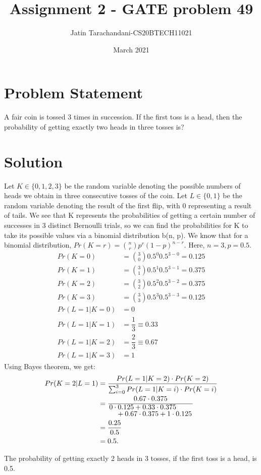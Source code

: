 \documentclass[twocolumn]{article}
\title{Assignment 2 - GATE problem 49}
\author{Jatin Tarachandani-CS20BTECH11021}
\date{March 2021}
\begin{document}
\maketitle
\section{Problem Statement}
A fair coin is tossed 3 times in succession. If the first toss is a head, then the probability of getting exactly two heads in three tosses is?
\section{Solution}
Let $K \in \{0, 1, 2, 3\}$ be the random variable denoting the possible numbers of heads we obtain in three consecutive tosses of the coin. Let $L \in \{0, 1\}$ be the random variable denoting the result of the first flip, with 0 representing a result of tails.
We see that K represents the probabilities of getting a certain number of successes in 3 distinct Bernoulli trials, so we can find the probabilities for K to take its possible values via a binomial distribution b(n, p).
We know that for a binomial distribution, $Pr(K=r)=\binom{n}{r}p^r (1-p)^{n-r}$. Here, $n=3, p=0.5$.
\begin{align}
    Pr(K=0)&=\binom{3}{0}0.5^0 0.5^{3-0}=0.125\\
    Pr(K=1)&=\binom{3}{1}0.5^1 0.5^{3-1}=0.375\\
    Pr(K=2)&=\binom{3}{2}0.5^2 0.5^{3-2}=0.375\\
    Pr(K=3)&=\binom{3}{3}0.5^3 0.5^{3-3}=0.125\\
    Pr(L=1|K=0)&=0\\
    Pr(L=1|K=1)&=\dfrac{1}{3} \equiv 0.33\\
    Pr(L=1|K=2)&=\dfrac{2}{3} \equiv 0.67\\
    Pr(L=1|K=3)&=1
\end{align}
Using Bayes theorem, we get:
\begin{align*}
    Pr(K=2|L=1)&=\frac{Pr(L=1|K=2)\cdot Pr(K=2)}{\sum_{i=0}^{3} Pr(L=1|K=i)\cdot Pr(K=i)}\\
    &=\frac{0.67\cdot 0.375}{\splitfrac{0\cdot0.125+0.33\cdot 0.375}{+0.67\cdot 0.375+1\cdot 0.125}}\\
    &=\frac{0.25}{0.5}\\
    &=0.5.
\end{align*}

The probability of getting exactly 2 heads in 3 tosses, if the first toss is a head, is 0.5.
\end{document}
